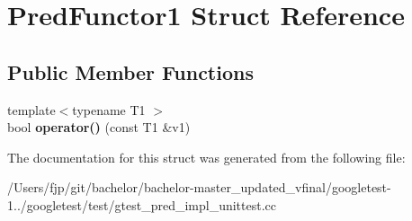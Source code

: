 \hypertarget{struct_pred_functor1}{}\section{Pred\+Functor1 Struct Reference}
\label{struct_pred_functor1}
\subsection*{Public Member Functions}
\begin{DoxyCompactItemize}
\item 
\mbox{\label{struct_pred_functor1_a78d81d1bac0ee7f81ea631c49bfab3e2}} 
{\footnotesize template$<$typename T1 $>$ }\\bool {\bfseries operator()} (const T1 \&v1)
\end{DoxyCompactItemize}


The documentation for this struct was generated from the following file\+:\begin{DoxyCompactItemize}
\item 
/\+Users/fjp/git/bachelor/bachelor-\/master\+\_\+updated\+\_\+vfinal/googletest-\/1../googletest/test/gtest\+\_\+pred\+\_\+impl\+\_\+unittest.\+cc\end{DoxyCompactItemize}
